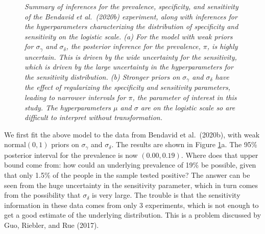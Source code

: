 \documentclass[11pt]{article}
\begin{document}
\begin{figure}
  \caption{\em Summary of inferences for the prevalence, specificity, and sensitivity of the Bendavid et al.\ (2020b) experiment, along with inferences for the hyperparameters characterizing the distribution of specificity and sensitivity on the logistic scale.  (a) For the model with weak priors for $\sigma_{\gamma}$ and $\sigma_{\delta}$, the posterior inference for the prevalence, $\pi$, is highly uncertain.  This is driven by the wide uncertainty for the sensitivity, which is driven by the large uncertainty in the hyperparameters for the sensitivity distribution. (b) Stronger priors on  $\sigma_{\gamma}$ and $\sigma_{\delta}$ have the effect of regularizing the specificity and sensitivity parameters, leading to narrower intervals for $\pi$, the parameter of interest in this study.  The hyperparameters $\mu$ and $\sigma$ are on the logistic scale so are difficult to interpret without transformation.}
\label{posterior2}
\end{figure} 

We first fit the above model to the data from Bendavid et al.\ (2020b), with weak $\mbox{normal}(0,1)$ priors on $\sigma_{\gamma}$ and $\sigma_{\delta}$.  The results are shown in Figure \ref{posterior2}a.  The 95\% posterior interval for the prevalence is now $(0.00, 0.19)$.  Where does that upper bound come from:  how could an underlying prevalence of 19\% be possible, given that only 1.5\% of the people in the sample tested positive?  The answer can be seen from the huge uncertainty in the sensitivity parameter, which in turn comes from the possibility that $\sigma_{\delta}$ is very large.  The trouble is that the sensitivity information in these data comes from only 3 experiments, which is not enough to get a good estimate of the underlying distribution.  This is a problem discussed by Guo, Riebler, and Rue (2017).
\end{document}
